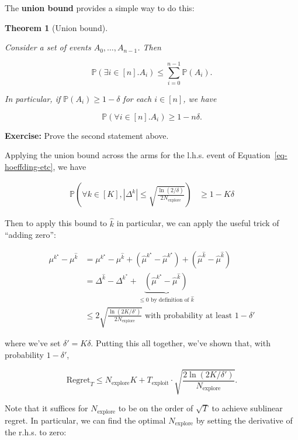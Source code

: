 \documentclass[
  letterpaper,
  DIV=11,
  numbers=noendperiod]{scrreprt}
\theoremstyle{plain}
\theoremstyle{plain}
\newtheorem{theorem}{Theorem}[chapter]
\theoremstyle{definition}
\theoremstyle{definition}
\theoremstyle{remark}
\begin{document}
The \textbf{union bound} provides a simple way to do this:

\begin{theorem}[Union
bound]\protect\hypertarget{thm-union_bound}{}\label{thm-union_bound}

Consider a set of events \(A_0, \dots, A_{n-1}\). Then

\[\mathbb{P}(\exists i \in [n]. A_i) \le \sum_{i=0}^{n-1} \mathbb{P}(A_i).\]

In particular, if \(\mathbb{P}(A_i) \ge 1 - \delta\) for each
\(i \in [n]\), we have

\[\mathbb{P}(\forall i \in [n]. A_i) \ge 1 - n \delta.\]

\end{theorem}

\textbf{Exercise:} Prove the second statement above.

Applying the union bound across the arms for the l.h.s. event of
Equation~\ref{eq-hoeffding-etc}, we have

\[
\begin{aligned}
    \mathbb{P}\left( \forall k \in [K], |\Delta^k | \le \sqrt{\frac{\ln(2/\delta)}{2N_{\text{explore}}}} \right) &\ge 1-K\delta
\end{aligned}
\]

Then to apply this bound to \(\hat k\) in particular, we can apply the
useful trick of ``adding zero'':

\[
\begin{aligned}
    \mu^{k^\star} - \mu^{\hat k} &= \mu^{k^\star} - \mu^{\hat k} + (\hat \mu^{k^\star} - \hat \mu^{k^\star}) + (\hat \mu^{\hat k} - \hat \mu^{\hat k}) \\
    &= \Delta^{\hat k} - \Delta^{k^*} + \underbrace{(\hat \mu^{k^\star} - \hat \mu^{\hat k})}_{\le 0 \text{ by definition of } \hat k} \\
    &\le 2 \sqrt{\frac{\ln(2K/\delta')}{2N_{\text{explore}}}} \text{ with probability at least } 1-\delta'
\end{aligned}
\]

where we've set \(\delta' = K\delta\). Putting this all together, we've
shown that, with probability \(1 - \delta'\),

\[\text{Regret}_T \le N_{\text{explore}}K + T_{\text{exploit}} \cdot \sqrt{\frac{2\ln(2K/\delta')}{N_{\text{explore}}}}.\]

Note that it suffices for \(N_{\text{explore}}\) to be on the order of
\(\sqrt{T}\) to achieve sublinear regret. In particular, we can find the
optimal \(N_{\text{explore}}\) by setting the derivative of the r.h.s.
to zero:
\end{document}
